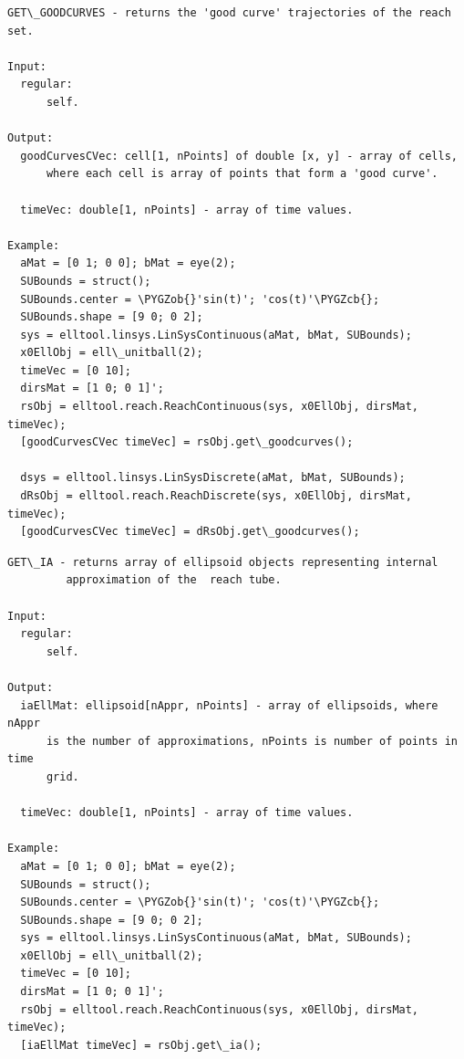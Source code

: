 \documentclass[letterpaper,10pt,english]{sphinxmanual}
\def\PYGZob{\char`\{}
\def\PYGZcb{\char`\}}
\begin{document}
\begin{Verbatim}[commandchars=\\\{\}]
GET\_GOODCURVES - returns the 'good curve' trajectories of the reach set.

Input:
  regular:
      self.

Output:
  goodCurvesCVec: cell[1, nPoints] of double [x, y] - array of cells,
      where each cell is array of points that form a 'good curve'.

  timeVec: double[1, nPoints] - array of time values.

Example:
  aMat = [0 1; 0 0]; bMat = eye(2);
  SUBounds = struct();
  SUBounds.center = \PYGZob{}'sin(t)'; 'cos(t)'\PYGZcb{};
  SUBounds.shape = [9 0; 0 2];
  sys = elltool.linsys.LinSysContinuous(aMat, bMat, SUBounds);
  x0EllObj = ell\_unitball(2);
  timeVec = [0 10];
  dirsMat = [1 0; 0 1]';
  rsObj = elltool.reach.ReachContinuous(sys, x0EllObj, dirsMat, timeVec);
  [goodCurvesCVec timeVec] = rsObj.get\_goodcurves();

  dsys = elltool.linsys.LinSysDiscrete(aMat, bMat, SUBounds);
  dRsObj = elltool.reach.ReachDiscrete(sys, x0EllObj, dirsMat, timeVec);
  [goodCurvesCVec timeVec] = dRsObj.get\_goodcurves();
\end{Verbatim}

\begin{Verbatim}[commandchars=\\\{\}]
GET\_IA - returns array of ellipsoid objects representing internal
         approximation of the  reach tube.

Input:
  regular:
      self.

Output:
  iaEllMat: ellipsoid[nAppr, nPoints] - array of ellipsoids, where nAppr
      is the number of approximations, nPoints is number of points in time
      grid.

  timeVec: double[1, nPoints] - array of time values.

Example:
  aMat = [0 1; 0 0]; bMat = eye(2);
  SUBounds = struct();
  SUBounds.center = \PYGZob{}'sin(t)'; 'cos(t)'\PYGZcb{};
  SUBounds.shape = [9 0; 0 2];
  sys = elltool.linsys.LinSysContinuous(aMat, bMat, SUBounds);
  x0EllObj = ell\_unitball(2);
  timeVec = [0 10];
  dirsMat = [1 0; 0 1]';
  rsObj = elltool.reach.ReachContinuous(sys, x0EllObj, dirsMat, timeVec);
  [iaEllMat timeVec] = rsObj.get\_ia();
\end{Verbatim}
\end{document}
